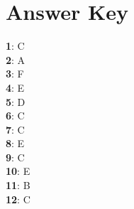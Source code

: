 \documentclass{exam}
\begin{document}
\begin{questions}
		\begin{choices}
		\end{choices}%

\newpage
\section*{Answer Key}
    \textbf{1}: C \\
    \textbf{2}: A \\
    \textbf{3}: F \\
    \textbf{4}: E \\
    \textbf{5}: D \\
    \textbf{6}: C \\
    \textbf{7}: C \\
    \textbf{8}: E \\
    \textbf{9}: C \\
    \textbf{10}: E \\
    \textbf{11}: B \\
    \textbf{12}: C \\
    
\end{questions}
\end{document}
